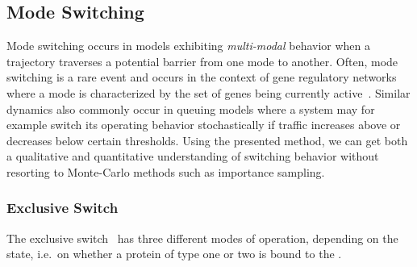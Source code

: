 \subsection{Mode Switching}
Mode switching occurs in models exhibiting   \emph{multi-modal} behavior
when a trajectory   traverses a potential barrier from one mode
to another.
Often, mode switching is a rare event and occurs in the context of
gene regulatory networks where a mode is characterized by the set of
genes being currently active~\parencite{loinger2007stochastic}.
Similar dynamics also commonly occur in queuing models where a system
may for example switch its operating  behavior stochastically if
traffic increases above or decreases below certain thresholds.
Using the presented method, we can get both a   qualitative and
quantitative understanding of   switching
behavior without resorting to Monte-Carlo methods such as   importance sampling.

\subsubsection*{Exclusive Switch}
The exclusive switch~\parencite{barzel2008calculation}  has three
different modes of operation, depending on the
 state, i.e.\ on whether a protein of type one or two is bound to
the .

